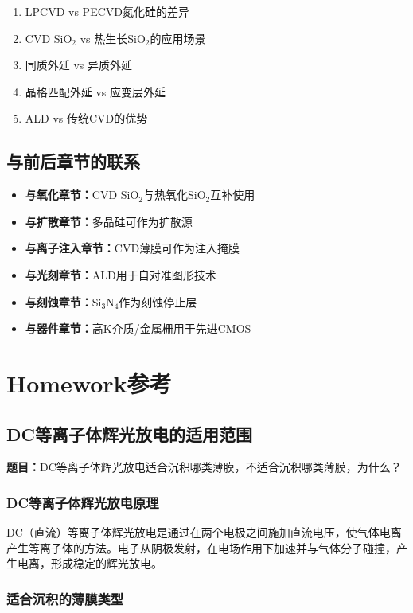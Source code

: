 \documentclass[UTF8,12pt,a4paper]{ctexart}
\begin{document}
\begin{enumerate}
    \item LPCVD vs PECVD氮化硅的差异
    \item CVD SiO$_2$ vs 热生长SiO$_2$的应用场景
    \item 同质外延 vs 异质外延
    \item 晶格匹配外延 vs 应变层外延
    \item ALD vs 传统CVD的优势
\end{enumerate}

\subsection{与前后章节的联系}

\begin{itemize}
    \item \textbf{与氧化章节：}CVD SiO$_2$与热氧化SiO$_2$互补使用
    \item \textbf{与扩散章节：}多晶硅可作为扩散源
    \item \textbf{与离子注入章节：}CVD薄膜可作为注入掩膜
    \item \textbf{与光刻章节：}ALD用于自对准图形技术
    \item \textbf{与刻蚀章节：}Si$_3$N$_4$作为刻蚀停止层
    \item \textbf{与器件章节：}高K介质/金属栅用于先进CMOS
\end{itemize}

\newpage

\section{Homework参考}

\subsection{DC等离子体辉光放电的适用范围}

\textbf{题目：}DC等离子体辉光放电适合沉积哪类薄膜，不适合沉积哪类薄膜，为什么？

\subsubsection{DC等离子体辉光放电原理}

DC（直流）等离子体辉光放电是通过在两个电极之间施加直流电压，使气体电离产生等离子体的方法。电子从阴极发射，在电场作用下加速并与气体分子碰撞，产生电离，形成稳定的辉光放电。

\subsubsection{适合沉积的薄膜类型}
\end{document}
